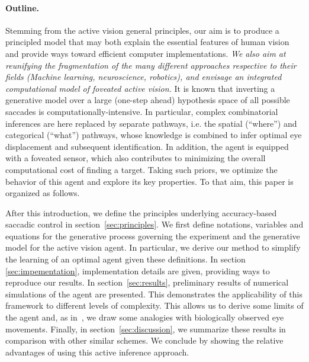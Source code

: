 \ICANN \paragraph{Outline.}\fi
Stemming from the active vision general principles, our aim is to produce a principled model that may both explain the essential features of human vision and provide ways toward efficient computer implementations. \ICANN
\else
\emph{We also aim at reunifying the fragmentation of the many different approaches respective to their fields (Machine learning, neuroscience, robotics), and envisage an integrated computational model of foveated active vision.}
\fi
It is known that inverting a generative model over a large (one-step ahead) hypothesis space of all possible saccades is computationally-intensive. %
In particular, complex combinatorial inferences are here replaced by separate pathways, i.e. the spatial (``where'') and categorical (``what'') pathways, whose knowledge is combined to infer optimal eye displacement and subsequent identification.    
\ICANN In addition,  the agent is equipped with a foveated sensor, %
which also contributes to minimizing the overall computational cost of finding a target. Taking such priors, we optimize the behavior of this agent and explore its key properties.\fi
To that aim, this paper is organized as follows.

After this introduction, we define the principles underlying accuracy-based saccadic control in section~\ref{sec:principles}.  We first define notations, variables and equations for the generative process governing the experiment and the generative model for the active vision agent. In particular, we  derive our method to simplify the learning of an optimal agent given these definitions. In section \ref{sec:impementation}, implementation details are given, providing ways to reproduce our results. In section~\ref{sec:results}, preliminary results of numerical simulations of the agent are presented. This demonstrates the applicability of this framework to different levels of complexity. This  allows us to derive some limits of the agent and, as in~\citep{Najemnik05}, we  draw some analogies with biologically observed eye movements. Finally, in section~\ref{sec:discussion}, we  summarize these results in comparison with other similar schemes. We  conclude by showing the relative advantages of using this active inference approach.
